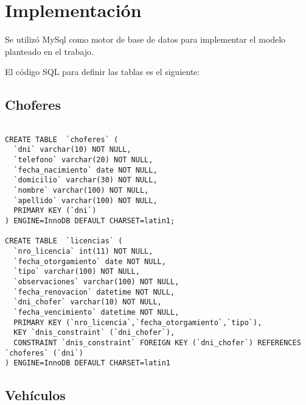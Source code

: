\section{Implementaci\'on}

Se utiliz\'o MySql como motor de base de datos para implementar el modelo planteado en el trabajo. 

El c\'odigo SQL para definir las tablas es el siguiente:

\subsection{Choferes}

\begin{verbatim}

CREATE TABLE  `choferes` (
  `dni` varchar(10) NOT NULL,
  `telefono` varchar(20) NOT NULL,
  `fecha_nacimiento` date NOT NULL,
  `domicilio` varchar(30) NOT NULL,
  `nombre` varchar(100) NOT NULL,
  `apellido` varchar(100) NOT NULL,
  PRIMARY KEY (`dni`)
) ENGINE=InnoDB DEFAULT CHARSET=latin1;

CREATE TABLE  `licencias` (
  `nro_licencia` int(11) NOT NULL,
  `fecha_otorgamiento` date NOT NULL,
  `tipo` varchar(100) NOT NULL,
  `observaciones` varchar(100) NOT NULL,
  `fecha_renovacion` datetime NOT NULL,
  `dni_chofer` varchar(10) NOT NULL,
  `fecha_vencimiento` datetime NOT NULL,
  PRIMARY KEY (`nro_licencia`,`fecha_otorgamiento`,`tipo`),
  KEY `dnis_constraint` (`dni_chofer`),
  CONSTRAINT `dnis_constraint` FOREIGN KEY (`dni_chofer`) REFERENCES `choferes` (`dni`)
) ENGINE=InnoDB DEFAULT CHARSET=latin1

\end{verbatim}

\subsection{Veh\'iculos}

